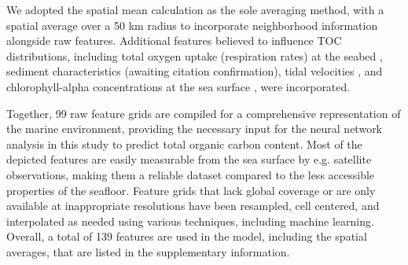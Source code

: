 \documentclass[journal abbreviation, manuscript]{copernicus}
\begin{document}
We adopted the spatial mean calculation as the sole averaging method, with a spatial average over a 50 km radius to incorporate neighborhood information alongside raw features. Additional features believed to influence TOC distributions, including total oxygen uptake (respiration rates) at the seabed \cite{TOU_JORGENSEN2022}, sediment characteristics (awaiting citation confirmation), tidal velocities \cite{HartDavis2021EOT20}, and chlorophyll-alpha concentrations at the sea surface \cite{nasaaqua}, were incorporated.



Together, 99 raw feature grids are compiled for a comprehensive representation of the marine environment, providing the necessary input for the neural network analysis in this study to predict total organic carbon content. Most of the depicted features are easily measurable from the sea surface by e.g. satellite observations, making them a reliable dataset compared to the less accessible properties of the seafloor. Feature grids that lack global coverage or are only available at inappropriate resolutions have been resampled, cell centered, and interpolated as needed using various techniques, including machine learning. Overall, a total of 139 features are used in the model, including the spatial averages, that are listed in the supplementary information.
\end{document}
